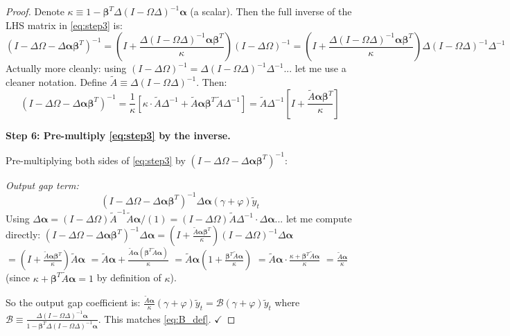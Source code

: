 \documentclass[12pt]{article}
\begin{document}
\begin{proof}
Denote $\kappa \equiv 1 - \bm{\beta}^T\Delta(I-\Omega\Delta)^{-1}\bm{\alpha}$ (a scalar). Then the full inverse of the LHS matrix in \eqref{eq:step3} is:
\begin{equation}
    (I - \Delta\Omega - \Delta\bm{\alpha}\bm{\beta}^T)^{-1} = \left(I + \frac{\Delta(I-\Omega\Delta)^{-1}\bm{\alpha}\bm{\beta}^T}{\kappa}\right)(I-\Delta\Omega)^{-1}
    = \left(I + \frac{\Delta(I-\Omega\Delta)^{-1}\bm{\alpha}\bm{\beta}^T}{\kappa}\right)\Delta(I-\Omega\Delta)^{-1}\Delta^{-1}
    \label{eq:fullinv}
\end{equation}
Actually more cleanly: using $(I-\Delta\Omega)^{-1} = \Delta(I-\Omega\Delta)^{-1}\Delta^{-1}$... let me use a cleaner notation. Define $\tilde{A} \equiv \Delta(I-\Omega\Delta)^{-1}$. Then:
\begin{equation}
    (I - \Delta\Omega - \Delta\bm{\alpha}\bm{\beta}^T)^{-1} = \frac{1}{\kappa}\left[\kappa\cdot\tilde{A}\Delta^{-1} + \tilde{A}\bm{\alpha}\bm{\beta}^T\tilde{A}\Delta^{-1}\right] = \tilde{A}\Delta^{-1}\left[I + \frac{\tilde{A}\bm{\alpha}\bm{\beta}^T}{\kappa}\right]
\end{equation}

\medskip
\textbf{Step 6: Pre-multiply \eqref{eq:step3} by the inverse.}

Pre-multiplying both sides of \eqref{eq:step3} by $(I-\Delta\Omega-\Delta\bm{\alpha}\bm{\beta}^T)^{-1}$:

\textit{Output gap term:}
\begin{equation}
    (I-\Delta\Omega-\Delta\bm{\alpha}\bm{\beta}^T)^{-1}\Delta\bm{\alpha}(\gamma+\varphi)\tilde{y}_t
\end{equation}
Using $\Delta\bm{\alpha} = (I-\Delta\Omega)\tilde{A}^{-1}\tilde{A}\bm{\alpha}/(1) = (I-\Delta\Omega)\tilde{A}\Delta^{-1}\cdot\Delta\bm{\alpha}$... let me compute directly:
$(I-\Delta\Omega-\Delta\bm{\alpha}\bm{\beta}^T)^{-1}\Delta\bm{\alpha} = (I+\frac{\tilde{A}\bm{\alpha}\bm{\beta}^T}{\kappa})(I-\Delta\Omega)^{-1}\Delta\bm{\alpha}$
$= (I+\frac{\tilde{A}\bm{\alpha}\bm{\beta}^T}{\kappa})\tilde{A}\bm{\alpha}$
$= \tilde{A}\bm{\alpha} + \frac{\tilde{A}\bm{\alpha}(\bm{\beta}^T\tilde{A}\bm{\alpha})}{\kappa}$
$= \tilde{A}\bm{\alpha}\left(1 + \frac{\bm{\beta}^T\tilde{A}\bm{\alpha}}{\kappa}\right)$
$= \tilde{A}\bm{\alpha} \cdot \frac{\kappa + \bm{\beta}^T\tilde{A}\bm{\alpha}}{\kappa}$
$= \frac{\tilde{A}\bm{\alpha}}{\kappa}$ (since $\kappa + \bm{\beta}^T\tilde{A}\bm{\alpha} = 1$ by definition of $\kappa$).

So the output gap coefficient is: $\frac{\tilde{A}\bm{\alpha}}{\kappa}(\gamma+\varphi)\tilde{y}_t = \mathcal{B}(\gamma+\varphi)\tilde{y}_t$ where $\mathcal{B} \equiv \frac{\Delta(I-\Omega\Delta)^{-1}\bm{\alpha}}{1-\bm{\beta}^T\Delta(I-\Omega\Delta)^{-1}\bm{\alpha}}$. This matches \eqref{eq:B_def}. $\checkmark$


\end{proof}
\end{document}
